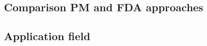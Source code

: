 \documentclass[class=article, crop=false]{standalone}
\begin{document}

\subsection{Comparison PM and FDA approaches}

\subsection{Application field}
\end{document}
